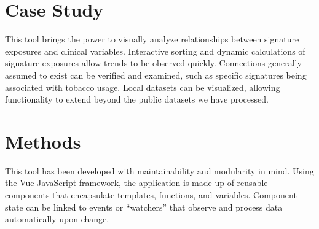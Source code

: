 \documentclass[12pt, letterpaper]{article}
\begin{document}
\section{Case Study}
This tool brings the power to visually analyze relationships between signature exposures and clinical variables.
Interactive sorting and dynamic calculations of signature exposures allow trends to be observed quickly.
Connections generally assumed to exist can be verified and examined, such as specific signatures being associated with tobacco usage.
Local datasets can be visualized, allowing functionality to extend beyond the public datasets we have processed.

\section{Methods}
This tool has been developed with maintainability and modularity in mind.
Using the Vue JavaScript framework, the application is made up of reusable components that encapsulate templates, functions, and variables.
Component state can be linked to events or ``watchers'' that observe and process data automatically upon change.


{}

\end{document}
